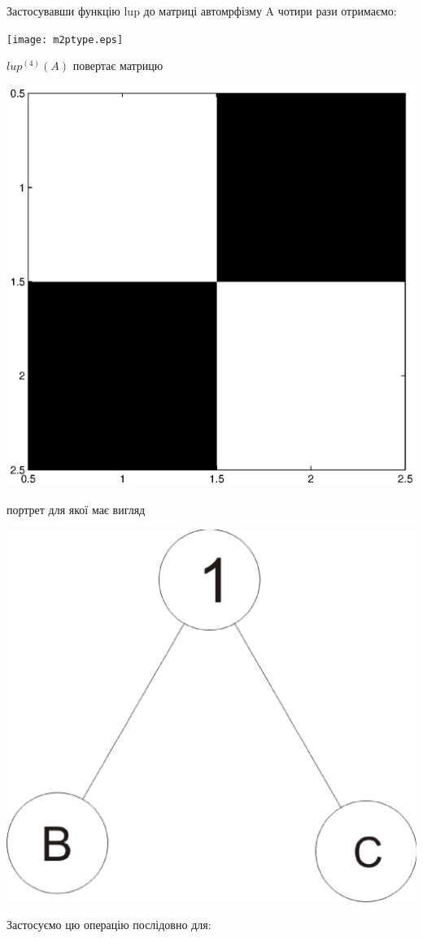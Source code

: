 \documentclass[a4paper,12pt]{article} \usepackage{a4wide}
\numberwithin{equation}{subsection}
\begin{document}
Застосувавши функцію lup до матриці автомрфізму A чотири рази отримаємо:
\begin{center}
\texttt{[image: m2ptype.eps]}
\end{center}
$lup^{(4)}(A)$ повертає матрицю
 \begin{center}
\includegraphics[scale=0.55]{m2p4.eps}
\end{center}
 портрет для якої має вигляд
 \begin{center}
\includegraphics[scale=0.3]{port1ab.eps}
\end{center}
Застосуємо цю операцію послідовно для:
\end{document}
